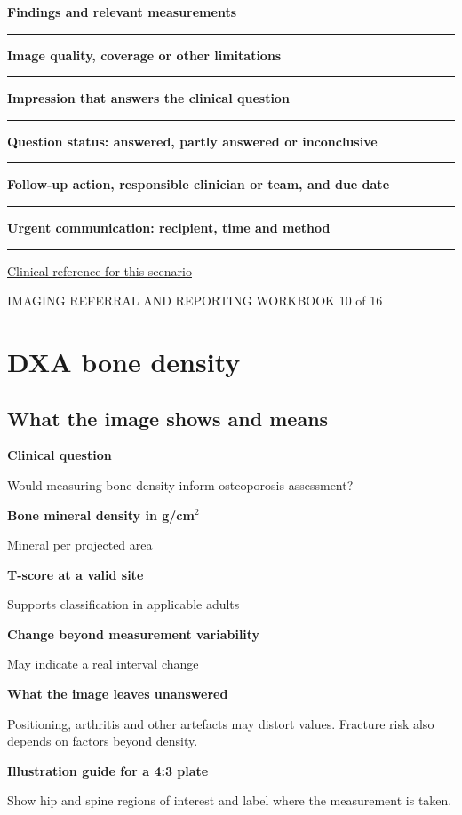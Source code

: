 \documentclass[11pt,a4paper]{article}
\newcommand{\record}[1]{\textbf{#1}\par\vspace{0.55\baselineskip}\hrule\vspace{0.35\baselineskip}}
\begin{document}
\record{Findings and relevant measurements}

\record{Image quality, coverage or other limitations}

\record{Impression that answers the clinical question}

\record{Question status: answered, partly answered or inconclusive}

\record{Follow-up action, responsible clinician or team, and due date}

\record{Urgent communication: recipient, time and method}

\small\href{https://www.uspreventiveservicestaskforce.org/uspstf/recommendation/osteoporosis-screening}{Clinical reference for this scenario}

\normalsize

\newpage

{\small IMAGING REFERRAL AND REPORTING WORKBOOK \hfill 10 of 16}

\section*{DXA bone density}

\subsection*{What the image shows and means}

\textbf{Clinical question}\par Would measuring bone density inform osteoporosis assessment?\par

\textbf{Bone mineral density in g/cm$^2$}\par Mineral per projected area\par

\textbf{T-score at a valid site}\par Supports classification in applicable adults\par

\textbf{Change beyond measurement variability}\par May indicate a real interval change\par

\textbf{What the image leaves unanswered}\par Positioning, arthritis and other artefacts may distort values. Fracture risk also depends on factors beyond density.\par

\textbf{Illustration guide for a 4:3 plate}\par Show hip and spine regions of interest and label where the measurement is taken.\par
\end{document}
